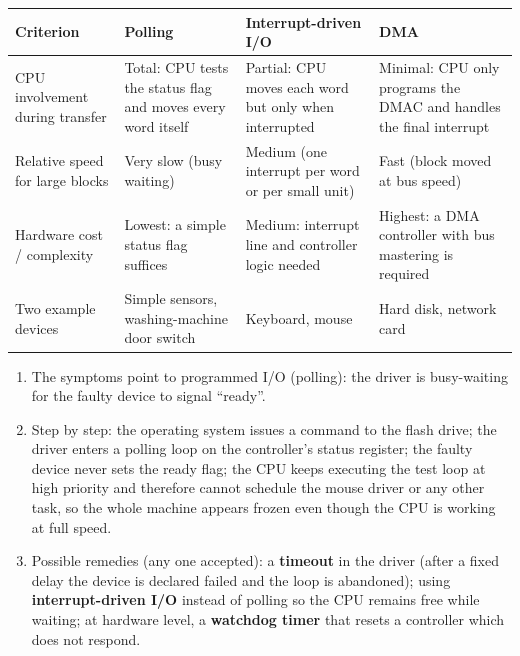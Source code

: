 \documentclass[11pt]{article}
\newcommand{\cle}[1]{{\popxbold\color{popdark}#1}}
\begin{document}
\begin{corrige}
\begin{center}
\begin{tabularx}{\linewidth}{|l|X|X|X|}
\hline
\rowcolor{popblueL} \textbf{Criterion} & \textbf{Polling} & \textbf{Interrupt-driven I/O} & \textbf{DMA} \\
\hline CPU involvement during transfer & Total: CPU tests the status flag and moves every word itself & Partial: CPU moves each word but only when interrupted & Minimal: CPU only programs the DMAC and handles the final interrupt \\
\hline Relative speed for large blocks & Very slow (busy waiting) & Medium (one interrupt per word or per small unit) & Fast (block moved at bus speed) \\
\hline Hardware cost / complexity & Lowest: a simple status flag suffices & Medium: interrupt line and controller logic needed & Highest: a DMA controller with bus mastering is required \\
\hline Two example devices & Simple sensors, washing-machine door switch & Keyboard, mouse & Hard disk, network card \\
\hline
\end{tabularx}
\end{center}
\end{corrige}

\begin{corrige}
\begin{enumerate}
\item The symptoms point to \cle{programmed I/O (polling)}: the driver is busy-waiting for the faulty device to signal ``ready''.
\item Step by step: the operating system issues a command to the flash drive; the driver enters a polling loop on the controller's status register; the faulty device never sets the ready flag; the CPU keeps executing the test loop at high priority and therefore cannot schedule the mouse driver or any other task, so the whole machine appears frozen even though the CPU is working at full speed.
\item Possible remedies (any one accepted): a \textbf{timeout} in the driver (after a fixed delay the device is declared failed and the loop is abandoned); using \textbf{interrupt-driven I/O} instead of polling so the CPU remains free while waiting; at hardware level, a \textbf{watchdog timer} that resets a controller which does not respond.
\end{enumerate}
\end{corrige}
\end{document}
